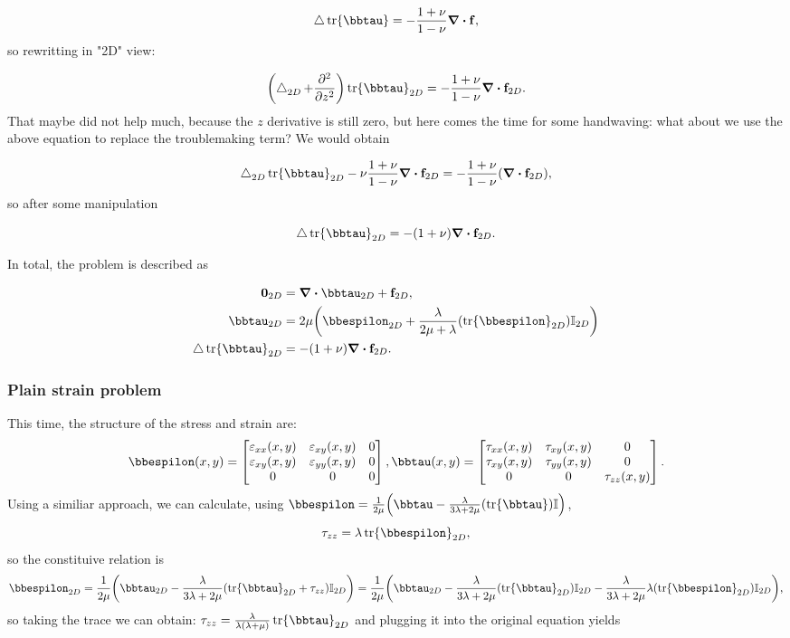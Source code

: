 \documentclass[../main.tex]{subfiles}
\begin{document}
\[
	\laplace \tr \bbtau = - \frac{1+\nu}{1-\nu} \divergence{\vb{f}},
\]
so rewritting in "2D" view:

\[
	\qty(\laplace_{2D}+\pdv[2]{z})\tr \bbtau_{2D} = -\frac{1+\nu}{1-\nu}\divergence{\vb{f}_{2D}}.
\]
That maybe did not help much, because the $z$ derivative is still zero, but here comes the time for some handwaving: what about we use the above equation to replace the troublemaking term? We would obtain

\[
	\laplace_{2D} \tr \bbtau_{2D} - \nu \frac{1+ \nu}{1- \nu} \divergence{\vb{f}_{2D}} = - \frac{1+\nu}{1- \nu}\qty(\divergence{ \vb{f}_{2D}}),
\]
so after some manipulation

\[
	\laplace \tr \bbtau_{2D} = -\qty(1+\nu)\divergence{\vb{f}_{2D}}.
\]

In total, the problem is described as

\begin{align}
  \label{eq:plane_stress_formulation}
  \vb{0}_{2D} &= \divergence{\bbtau_{2D}} + \vb{f}_{2D},\\
  \bbtau_{2D} &= 2 \mu\qty(\bbespilon_{2D}+\frac{\lambda}{2 \mu+\lambda}\qty(\tr \bbespilon_{2D})\identity_{2D}) \\
  \laplace \tr \bbtau_{2D} &= -\qty(1+\nu)\divergence{\vb{f}_{2D}}.
\end{align}

\subsubsection{Plain strain problem}
\label{sec:plain_strain_problem}
This time, the structure of the stress and strain are:
\[
	\bbespilon\qty(x,y)=\begin{bmatrix}
		\varepsilon_{xx}\qty(x,y) & \varepsilon_{xy}\qty(x,y) & 0 \\
		\varepsilon_{xy}\qty(x,y) & \varepsilon_{yy}\qty(x,y) & 0 \\
		0 & 0 & 0
	\end{bmatrix}, 	
	\bbtau\qty(x,y)=\begin{bmatrix}
		\tau_{xx}\qty(x,y) & \tau_{xy}\qty(x,y) & 0 \\
		\tau_{xy}\qty(x,y) & \tau_{yy}\qty(x,y) & 0 \\
		0 & 0 & \tau_{zz}\qty(x,y)
	\end{bmatrix}.
\]
Using a similiar approach, we can calculate, using $\bbespilon = \frac{1}{2 \mu}\qty(\bbtau-\frac{\lambda}{3 \lambda + 2 \mu}\qty(\tr \bbtau)\identity)$,
\[
	\tau_{zz} = \lambda \tr \bbespilon_{2D},
\]
so the constituive relation is
\[
	\bbespilon_{2D} = \frac{1}{2 \mu}\qty(\bbtau_{2D}- \frac{\lambda}{3 \lambda+ 2 \mu}\qty(\tr \bbtau_{2D}+\tau_{zz})\identity_{2D}) = \frac{1}{2 \mu}\qty(\bbtau_{2D}-\frac{\lambda}{3 \lambda+ 2 \mu}\qty(\tr \bbtau_{2D})\identity_{2D}-\frac{\lambda}{3 \lambda+ 2 \mu}\lambda \qty(\tr \bbespilon_{2D})\identity_{2D}),
\]
so taking the trace we can obtain: $\tau_{zz} = \frac{\lambda}{\lambda\qty(\lambda+\mu)} \tr \bbtau_{2D}$ and plugging it into the original equation yields
\end{document}
